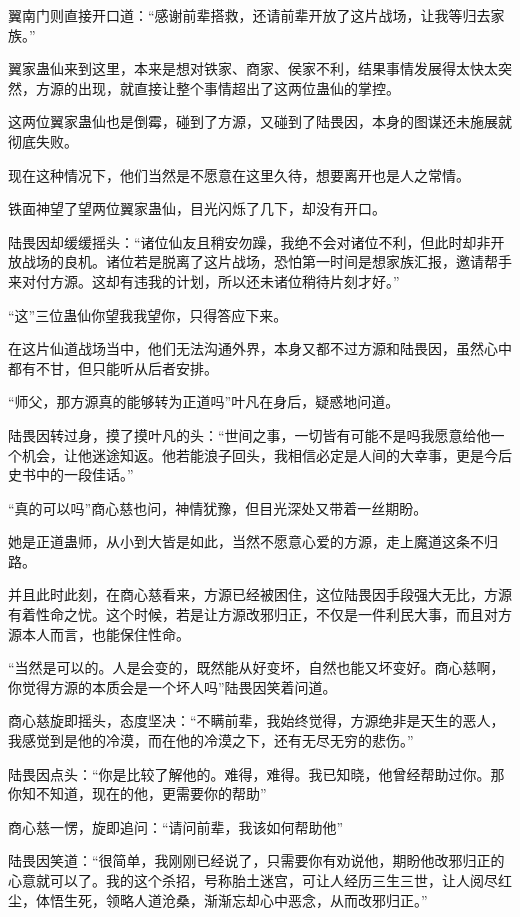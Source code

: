 \begin{this_body}
翼南门则直接开口道：“感谢前辈搭救，还请前辈开放了这片战场，让我等归去家族。”

翼家蛊仙来到这里，本来是想对铁家、商家、侯家不利，结果事情发展得太快太突然，方源的出现，就直接让整个事情超出了这两位蛊仙的掌控。

这两位翼家蛊仙也是倒霉，碰到了方源，又碰到了陆畏因，本身的图谋还未施展就彻底失败。

现在这种情况下，他们当然是不愿意在这里久待，想要离开也是人之常情。

铁面神望了望两位翼家蛊仙，目光闪烁了几下，却没有开口。

陆畏因却缓缓摇头：“诸位仙友且稍安勿躁，我绝不会对诸位不利，但此时却非开放战场的良机。诸位若是脱离了这片战场，恐怕第一时间是想家族汇报，邀请帮手来对付方源。这却有违我的计划，所以还未诸位稍待片刻才好。”

“这”三位蛊仙你望我我望你，只得答应下来。

在这片仙道战场当中，他们无法沟通外界，本身又都不过方源和陆畏因，虽然心中都有不甘，但只能听从后者安排。

“师父，那方源真的能够转为正道吗”叶凡在身后，疑惑地问道。

陆畏因转过身，摸了摸叶凡的头：“世间之事，一切皆有可能不是吗我愿意给他一个机会，让他迷途知返。他若能浪子回头，我相信必定是人间的大幸事，更是今后史书中的一段佳话。”

“真的可以吗”商心慈也问，神情犹豫，但目光深处又带着一丝期盼。

她是正道蛊师，从小到大皆是如此，当然不愿意心爱的方源，走上魔道这条不归路。

并且此时此刻，在商心慈看来，方源已经被困住，这位陆畏因手段强大无比，方源有着性命之忧。这个时候，若是让方源改邪归正，不仅是一件利民大事，而且对方源本人而言，也能保住性命。

“当然是可以的。人是会变的，既然能从好变坏，自然也能又坏变好。商心慈啊，你觉得方源的本质会是一个坏人吗”陆畏因笑着问道。

商心慈旋即摇头，态度坚决：“不瞒前辈，我始终觉得，方源绝非是天生的恶人，我感觉到是他的冷漠，而在他的冷漠之下，还有无尽无穷的悲伤。”

陆畏因点头：“你是比较了解他的。难得，难得。我已知晓，他曾经帮助过你。那你知不知道，现在的他，更需要你的帮助”

商心慈一愣，旋即追问：“请问前辈，我该如何帮助他”

陆畏因笑道：“很简单，我刚刚已经说了，只需要你有劝说他，期盼他改邪归正的心意就可以了。我的这个杀招，号称胎土迷宫，可让人经历三生三世，让人阅尽红尘，体悟生死，领略人道沧桑，渐渐忘却心中恶念，从而改邪归正。”


\end{this_body}
